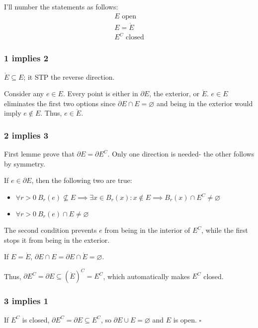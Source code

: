\documentclass[12pt]{article}
\begin{document}
I'll number the statements as follows:
\begin{gather}
    E\text{ open} \\
    E = \mathring{E} \\
    E^C\text{ closed}
\end{gather}

\subsubsection{1 implies 2}

$\mathring{E} \subseteq E$; it STP the reverse direction.

Consider any $e \in E$.
Every point is either in $\partial E$, the exterior, or $\mathring{E}$.
$e \in E$ eliminates the first two options since $\partial E \cap E = \varnothing$
and being in the exterior would imply $e \notin E$.
Thus, $e \in \mathring{E}$.

\subsubsection{2 implies 3}

First lemme prove that $\partial E = \partial E^C$.
Only one direction is needed- the other follows by symmetry.

If $e \in \partial E$, then the following two are true:
\begin{itemize}
    \item $\forall r > 0\ B_r(e) \nsubseteq E \implies \exists x \in B_r(x): x \notin E \implies B_r(x) \cap E^C \ne \varnothing$
    \item $\forall r > 0\ B_r(e) \cap E \ne \varnothing$
\end{itemize}
The second condition prevents $e$ from being in the interior of $E^C$,
while the first stops it from being in the exterior.

If $E=\mathring{E}$, $\partial E \cap E = \partial E \cap \mathring{E}=\varnothing$.

Thus, $\partial E^C = \partial E \subseteq \left(\mathring{E}\right)^C=E^C$,
which automatically makes $E^C$ closed.

\subsubsection{3 implies 1}

If $E^C$ is closed, $\partial E^C = \partial E \subseteq E^C$,
so $\partial E \cup E = \varnothing$ and $E$ is open. $\square$
\end{document}
